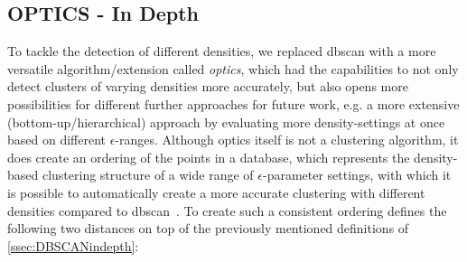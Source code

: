 \subsection{OPTICS - In Depth}\label{ssec:OPTICSindepth} %
To tackle the detection of different densities, we replaced \gls{dbscan} with a more versatile algorithm/extension called \textit{\acrfull{optics}}, which had the capabilities to not only detect clusters of varying densities more accurately, but also opens more possibilities for different further approaches for future work, e.g. a more extensive (bottom-up/hierarchical) approach by evaluating more density-settings at once based on different $\epsilon$-ranges.
Although \gls{optics} itself is not a clustering algorithm, it does create an ordering of the points in a database, which represents the density-based clustering structure of a wide range of $\epsilon$-parameter settings, with which it is possible to automatically create a more accurate clustering with different densities compared to \gls{dbscan}~\cite{opticsankerst1999optics}. To create such a consistent ordering  \citeauthor{opticsankerst1999optics} defines the following two distances on top of the previously mentioned definitions of \autoref{ssec:DBSCANindepth}:
\vspace{5mm}

